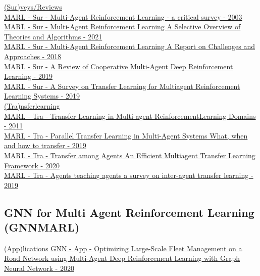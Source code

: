 \underline{(Sur)veys/Reviews}
\\
\href{http://ai.stanford.edu/people/shoham/www%20papers/MALearning_ACriticalSurvey_2003_0516.pdf}{MARL - Sur - Multi-Agent Reinforcement Learning - a critical survey - 2003}
\\
\href{https://arxiv.org/abs/1911.10635}{MARL - Sur - Multi-Agent Reinforcement Learning A Selective Overview of Theories and Algorithms - 2021}
\\
\href{https://arxiv.org/abs/1807.09427}{MARL - Sur - Multi-Agent Reinforcement Learning A Report on Challenges and Approaches - 2018}
\\
\href{https://arxiv.org/abs/1908.03963}{MARL - Sur - A Review of Cooperative Multi-Agent Deep Reinforcement Learning - 2019}
\\
\href{https://www.jair.org/index.php/jair/article/view/11396}{MARL - Sur - A Survey on Transfer Learning for Multiagent Reinforcement Learning Systems  - 2019}
\\

\underline{(Tra)nsferlearning}
\\
\href{https://link.springer.com/chapter/10.1007/978-3-642-29946-9_25}{MARL - Tra - Transfer Learning in Multi-agent ReinforcementLearning Domains - 2011}
\\
\href{https://ieeexplore.ieee.org/abstract/document/8851784}{MARL - Tra - Parallel Transfer Learning in Multi-Agent Systems What, when and how to transfer - 2019}
\\
\href{https://arxiv.org/abs/2002.08030}{MARL - Tra - Transfer among Agents An Efficient Multiagent Transfer Learning Framework - 2020}
\\
\href{https://link.springer.com/article/10.1007/s10458-019-09430-0}{MARL - Tra - Agents teaching agents a survey on inter-agent transfer learning - 2019}
\\


\subsection{GNN for Multi Agent Reinforcement Learning (GNNMARL)}
\underline{(App)lications}
\href{https://arxiv.org/abs/2011.06175}{GNN - App - Optimizing Large-Scale Fleet Management on a Road Network using Multi-Agent Deep Reinforcement Learning with Graph Neural Network - 2020}
\\


